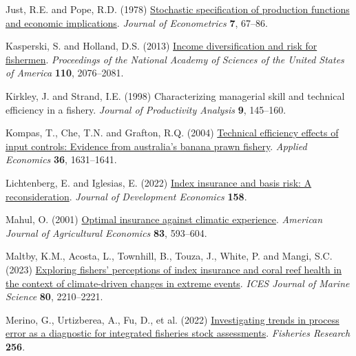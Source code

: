 \documentclass[
  letterpaper,
  DIV=11,
  numbers=noendperiod]{scrartcl}
\newlength{\cslhangindent}
\newlength{\cslentryspacingunit} %
\newenvironment{CSLReferences}[2] %
 {%
  \setlength{\parindent}{0pt}
  \ifodd #1
  \let\oldpar\par
  \def\par{\hangindent=\cslhangindent\oldpar}
  \fi
  \setlength{\parskip}{#2\cslentryspacingunit}
 }%
 {}
\theoremstyle{plain}
\theoremstyle{plain}
\theoremstyle{remark}
\begin{document}
\begin{CSLReferences}{1}{0}
\leavevmode{}%
Just, R.E. and Pope, R.D. (1978)
\href{https://doi.org/10.1016/0304-4076(78)90006-4}{Stochastic
specification of production functions and economic implications}.
\emph{Journal of Econometrics} \textbf{7}, 67--86.

\leavevmode{}%
Kasperski, S. and Holland, D.S. (2013)
\href{https://doi.org/10.1073/pnas.1212278110}{Income diversification
and risk for fishermen}. \emph{Proceedings of the National Academy of
Sciences of the United States of America} \textbf{110}, 2076--2081.

\leavevmode{}%
Kirkley, J. and Strand, I.E. (1998) Characterizing managerial skill and
technical efficiency in a fishery. \emph{Journal of Productivity
Analysis} \textbf{9}, 145--160.

\leavevmode{}%
Kompas, T., Che, T.N. and Grafton, R.Q. (2004)
\href{https://doi.org/10.1080/0003684042000218561}{Technical efficiency
effects of input controls: Evidence from australia's banana prawn
fishery}. \emph{Applied Economics} \textbf{36}, 1631--1641.

\leavevmode{}%
Lichtenberg, E. and Iglesias, E. (2022)
\href{https://doi.org/10.1016/j.jdeveco.2022.102883}{Index insurance and
basis risk: A reconsideration}. \emph{Journal of Development Economics}
\textbf{158}.

\leavevmode{}%
Mahul, O. (2001) \href{https://doi.org/10.1111/0002-9092.00180}{Optimal
insurance against climatic experience}. \emph{American Journal of
Agricultural Economics} \textbf{83}, 593--604.

\leavevmode{}%
Maltby, K.M., Acosta, L., Townhill, B., Touza, J., White, P. and Mangi,
S.C. (2023) \href{https://doi.org/10.1093/icesjms/fsac003}{Exploring
fishers' perceptions of index insurance and coral reef health in the
context of climate-driven changes in extreme events}. \emph{ICES Journal
of Marine Science} \textbf{80}, 2210--2221.

\leavevmode{}%
Merino, G., Urtizberea, A., Fu, D., et al. (2022)
\href{https://doi.org/10.1016/j.fishres.2022.106478}{Investigating
trends in process error as a diagnostic for integrated fisheries stock
assessments}. \emph{Fisheries Research} \textbf{256}.


\end{CSLReferences}
\end{document}
